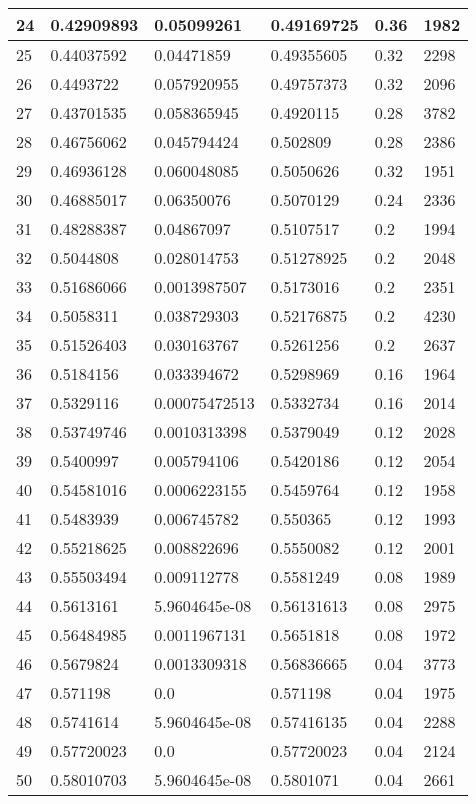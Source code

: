 \begin{longtable}{|l|l|l|l|l|l|}
24 & 0.42909893 & 0.05099261 & 0.49169725 & 0.36 & 1982 \\ \hline 
25 & 0.44037592 & 0.04471859 & 0.49355605 & 0.32 & 2298 \\ \hline 
26 & 0.4493722 & 0.057920955 & 0.49757373 & 0.32 & 2096 \\ \hline 
27 & 0.43701535 & 0.058365945 & 0.4920115 & 0.28 & 3782 \\ \hline 
28 & 0.46756062 & 0.045794424 & 0.502809 & 0.28 & 2386 \\ \hline 
29 & 0.46936128 & 0.060048085 & 0.5050626 & 0.32 & 1951 \\ \hline 
30 & 0.46885017 & 0.06350076 & 0.5070129 & 0.24 & 2336 \\ \hline 
31 & 0.48288387 & 0.04867097 & 0.5107517 & 0.2 & 1994 \\ \hline 
32 & 0.5044808 & 0.028014753 & 0.51278925 & 0.2 & 2048 \\ \hline 
33 & 0.51686066 & 0.0013987507 & 0.5173016 & 0.2 & 2351 \\ \hline 
34 & 0.5058311 & 0.038729303 & 0.52176875 & 0.2 & 4230 \\ \hline 
35 & 0.51526403 & 0.030163767 & 0.5261256 & 0.2 & 2637 \\ \hline 
36 & 0.5184156 & 0.033394672 & 0.5298969 & 0.16 & 1964 \\ \hline 
37 & 0.5329116 & 0.00075472513 & 0.5332734 & 0.16 & 2014 \\ \hline 
38 & 0.53749746 & 0.0010313398 & 0.5379049 & 0.12 & 2028 \\ \hline 
39 & 0.5400997 & 0.005794106 & 0.5420186 & 0.12 & 2054 \\ \hline 
40 & 0.54581016 & 0.0006223155 & 0.5459764 & 0.12 & 1958 \\ \hline 
41 & 0.5483939 & 0.006745782 & 0.550365 & 0.12 & 1993 \\ \hline 
42 & 0.55218625 & 0.008822696 & 0.5550082 & 0.12 & 2001 \\ \hline 
43 & 0.55503494 & 0.009112778 & 0.5581249 & 0.08 & 1989 \\ \hline 
44 & 0.5613161 & 5.9604645e-08 & 0.56131613 & 0.08 & 2975 \\ \hline 
45 & 0.56484985 & 0.0011967131 & 0.5651818 & 0.08 & 1972 \\ \hline 
46 & 0.5679824 & 0.0013309318 & 0.56836665 & 0.04 & 3773 \\ \hline 
47 & 0.571198 & 0.0 & 0.571198 & 0.04 & 1975 \\ \hline 
48 & 0.5741614 & 5.9604645e-08 & 0.57416135 & 0.04 & 2288 \\ \hline 
49 & 0.57720023 & 0.0 & 0.57720023 & 0.04 & 2124 \\ \hline 
50 & 0.58010703 & 5.9604645e-08 & 0.5801071 & 0.04 & 2661 \\ \hline 
\end{longtable}